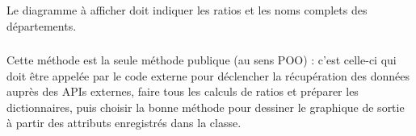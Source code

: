 \noindent Le diagramme à afficher doit indiquer les ratios et les noms complets des départements.


\bigskip


\subsubsection*{}

\noindent Cette méthode est la seule méthode publique (au sens POO) : c'est celle-ci qui doit être appelée par le code externe pour déclencher la récupération des données auprès des APIs externes, faire tous les calculs de ratios et préparer les dictionnaires, puis choisir la bonne méthode pour dessiner le graphique de sortie à partir des attributs enregistrés dans la classe.
